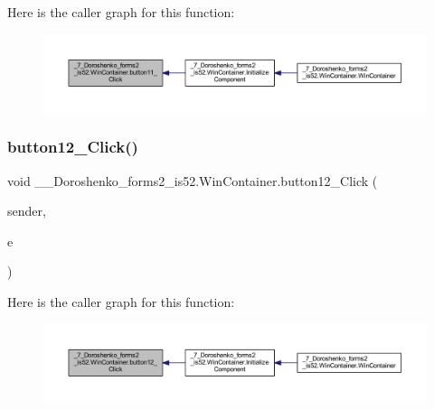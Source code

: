 Here is the caller graph for this function\+:
\nopagebreak
\begin{figure}[H]
\begin{center}
\leavevmode
\includegraphics[width=350pt]{class__7___doroshenko__forms2__is52_1_1_win_container_add06f6a4a96485f5434f2f47b92f1f90_icgraph}
\end{center}
\end{figure}
\hypertarget{class__7___doroshenko__forms2__is52_1_1_win_container_ac4f8e9e2c73d7f6532d6b0d79d7c2547}{}\label{class__7___doroshenko__forms2__is52_1_1_win_container_ac4f8e9e2c73d7f6532d6b0d79d7c2547} 
\subsubsection{\texorpdfstring{button12\+\_\+\+Click()}{button12\_Click()}}
{\footnotesize\ttfamily void \+\_\+\_\+\+Doroshenko\+\_\+forms2\+\_\+is52.\+Win\+Container.\+button12\+\_\+\+Click (\begin{DoxyParamCaption}\item[{object}]{sender,  }\item[{Event\+Args}]{e }\end{DoxyParamCaption})\hspace{0.3cm}{\ttfamily [private]}}

Here is the caller graph for this function\+:
\nopagebreak
\begin{figure}[H]
\begin{center}
\leavevmode
\includegraphics[width=350pt]{class__7___doroshenko__forms2__is52_1_1_win_container_ac4f8e9e2c73d7f6532d6b0d79d7c2547_icgraph}
\end{center}
\end{figure}
\hypertarget{class__7___doroshenko__forms2__is52_1_1_win_container_a25a617a2c938199596c5dc653fba1770}{}\label{class__7___doroshenko__forms2__is52_1_1_win_container_a25a617a2c938199596c5dc653fba1770} 
